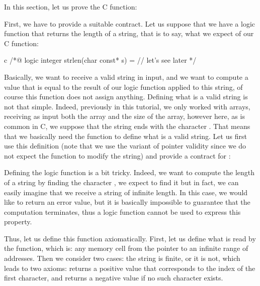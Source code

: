 

In this section, let us prove the C  function:




First, we have to provide a suitable contract. Let us suppose that we
have a logic function  that returns the length of a
string, that is to say, what we expect of our C function:


\begin{CodeBlock}{c}
/*@
  logic integer strlen(char const* s) = // let's see later
*/
\end{CodeBlock}



Basically, we want to receive a valid string in input, and we want to
compute a value that is equal to the result of our logic function
 applied to this string, of course this function
does not assign anything. Defining what is a valid string is not that
simple. Indeed, previously in this tutorial, we only worked with
arrays, receiving as input both the array and the size of the array,
however here, as is common in C, we suppose that the string ends
with the character . That means that we
basically need the  function to define what is a
valid string. Let us first use this definition (note that we use the
 variant of pointer validity
since we do not expect the function to modify the string) and provide
a contract for :






Defining the logic function  is a bit tricky. Indeed,
we want to compute the length of a string by finding the character
, we expect to find it but in fact, we
can easily imagine that we receive a string of infinite length. In this case,
we would like to return an error value, but it is basically impossible to
guarantee that the computation terminates, thus a logic function cannot
be used to express this property.



Thus, let us define this function axiomatically. First, let us define what
is read by the function, which is: any memory cell from the pointer to an
infinite range of addresses. Then we consider two cases: the string is
finite, or it is not, which leads to two axioms:  returns
a positive value that corresponds to the index of the first
 character, and returns a negative value if
no such character exists.



